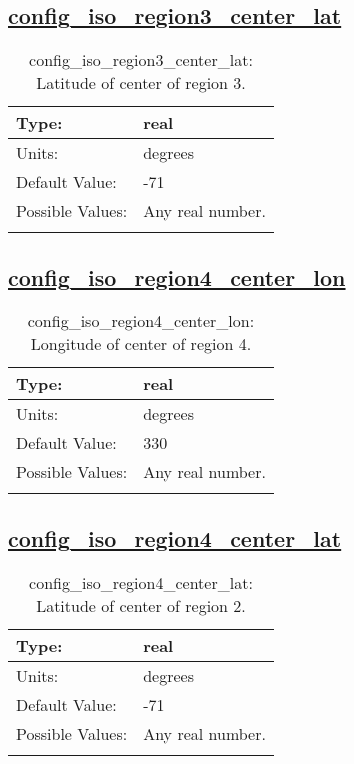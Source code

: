 \subsection[config\_iso\_region3\_center\_lat]{\hyperref[sec:nm_tab_iso]{config\_iso\_region3\_center\_lat}}
\label{subsec:nm_sec_config_iso_region3_center_lat}
\begin{center}
\begin{longtable}{| p{2.0in} || p{4.0in} |}
    \hline
    Type: & real \\
    \hline
    Units: & \si{degrees} \\
    \hline
    Default Value: & -71 \\
    \hline
    Possible Values: & Any real number. \\
    \hline
    \caption{config\_iso\_region3\_center\_lat: Latitude of center of region 3.}
\end{longtable}
\end{center}
\subsection[config\_iso\_region4\_center\_lon]{\hyperref[sec:nm_tab_iso]{config\_iso\_region4\_center\_lon}}
\label{subsec:nm_sec_config_iso_region4_center_lon}
\begin{center}
\begin{longtable}{| p{2.0in} || p{4.0in} |}
    \hline
    Type: & real \\
    \hline
    Units: & \si{degrees} \\
    \hline
    Default Value: & 330 \\
    \hline
    Possible Values: & Any real number. \\
    \hline
    \caption{config\_iso\_region4\_center\_lon: Longitude of center of region 4.}
\end{longtable}
\end{center}
\subsection[config\_iso\_region4\_center\_lat]{\hyperref[sec:nm_tab_iso]{config\_iso\_region4\_center\_lat}}
\label{subsec:nm_sec_config_iso_region4_center_lat}
\begin{center}
\begin{longtable}{| p{2.0in} || p{4.0in} |}
    \hline
    Type: & real \\
    \hline
    Units: & \si{degrees} \\
    \hline
    Default Value: & -71 \\
    \hline
    Possible Values: & Any real number. \\
    \hline
    \caption{config\_iso\_region4\_center\_lat: Latitude of center of region 2.}
\end{longtable}
\end{center}
